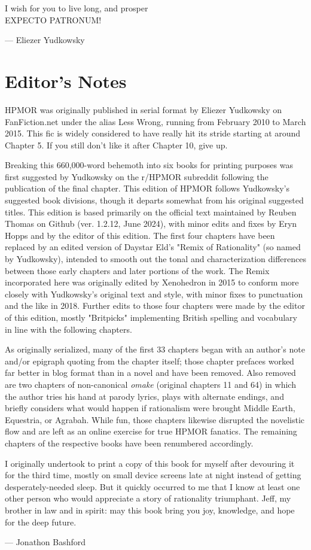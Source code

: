 I wish for you to live long, and prosper\\
EXPECTO PATRONUM!

— Eliezer Yudkowsky

\section*{Editor's Notes}

HPMOR was originally published in serial format by Eliezer Yudkowsky on FanFiction.net under the alias Less Wrong, running from February 2010 to March 2015. This fic is widely considered to have really hit its stride starting at around Chapter 5. If you still don't like it after Chapter 10, give up.

Breaking this 660,000-word behemoth into six books for printing purposes was first suggested by Yudkowsky on the r/HPMOR subreddit following the publication of the final chapter. This edition of HPMOR follows Yudkowsky's suggested book divisions, though it departs somewhat from his original suggested titles. This edition is based primarily on the official text maintained by Reuben Thomas on Github (ver. 1.2.12, June 2024), with minor edits and fixes by Eryn Hopps and by the editor of this edition. The first four chapters have been replaced by an edited version of Daystar Eld's "Remix of Rationality" (so named by Yudkowsky), intended to smooth out the tonal and characterization differences between those early chapters and later portions of the work. The Remix incorporated here was originally edited by Xenohedron in 2015 to conform more closely with Yudkowsky's original text and style, with minor fixes to punctuation and the like in 2018. Further edits to those four chapters were made by the editor of this edition, mostly "Britpicks" implementing British spelling and vocabulary in line with the following chapters. 

As originally serialized, many of the first 33 chapters began with an author's note and/or epigraph quoting from the chapter itself; those chapter prefaces worked far better in blog format than in a novel and have been removed. Also removed are two chapters of non-canonical  \emph{omake} (original chapters 11 and 64) in which the author tries his hand at parody lyrics, plays with alternate endings, and briefly considers what would happen if rationalism were brought Middle Earth, Equestria, or Agrabah. While fun, those chapters likewise disrupted the novelistic flow and are left as an online exercise for true HPMOR fanatics. The remaining chapters of the respective books have been renumbered accordingly.

I originally undertook to print a copy of this book for myself after devouring it for the third time, mostly on small device screens late at night instead of getting desperately-needed sleep. But it quickly occurred to me that I know at least one other person who would appreciate a story of rationality triumphant. Jeff, my brother in law and in spirit: may this book bring you joy, knowledge, and hope for the deep future.

— Jonathon Bashford

